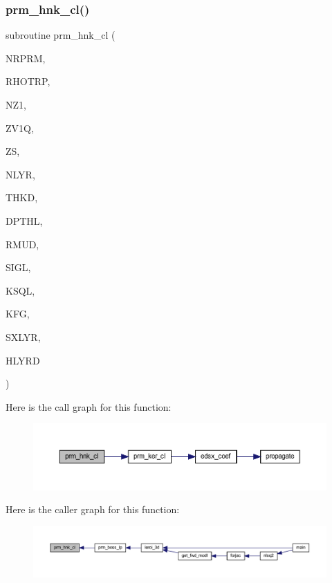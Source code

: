 \subsubsection{\texorpdfstring{prm\+\_\+hnk\+\_\+cl()}{prm\_hnk\_cl()}}
{\footnotesize\ttfamily subroutine prm\+\_\+hnk\+\_\+cl (\begin{DoxyParamCaption}\item[{integer}]{N\+R\+P\+RM,  }\item[{real, dimension(nrprm)}]{R\+H\+O\+T\+RP,  }\item[{integer}]{N\+Z1,  }\item[{real(kind=ql), dimension(nz1)}]{Z\+V1Q,  }\item[{real(kind=ql)}]{ZS,  }\item[{integer}]{N\+L\+YR,  }\item[{real(kind=ql), dimension (nlyr)}]{T\+H\+KD,  }\item[{real(kind=ql), dimension (nlyr)}]{D\+P\+T\+HL,  }\item[{real(kind=ql), dimension(0\+:nlyr)}]{R\+M\+UD,  }\item[{complex(kind=ql), dimension (nlyr)}]{S\+I\+GL,  }\item[{complex(kind=ql), dimension (nlyr)}]{K\+S\+QL,  }\item[{integer}]{K\+FG,  }\item[{integer}]{S\+X\+L\+YR,  }\item[{complex(kind=ql), dimension(nrprm,3,nz1)}]{H\+L\+Y\+RD }\end{DoxyParamCaption})}

Here is the call graph for this function\+:\nopagebreak
\begin{figure}[H]
\begin{center}
\leavevmode
\includegraphics[width=350pt]{Leroi_8f90_a677c57fa23bac760da7b8f845b3f9f9d_cgraph}
\end{center}
\end{figure}
Here is the caller graph for this function\+:\nopagebreak
\begin{figure}[H]
\begin{center}
\leavevmode
\includegraphics[width=350pt]{Leroi_8f90_a677c57fa23bac760da7b8f845b3f9f9d_icgraph}
\end{center}
\end{figure}
\mbox{\label{Leroi_8f90_a9740ab7613ac873fc595cc92e6d5fbaf}} 
